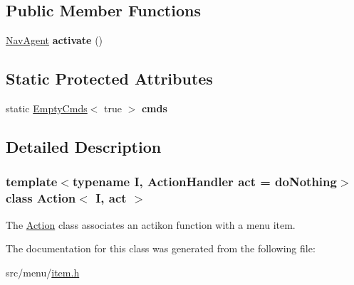 \subsection*{Public Member Functions}
\begin{DoxyCompactItemize}
\item 
\mbox{\label{classAction_a1a642e0df4201fa781e8143da61fd808}} 
\hyperlink{structNavAgent}{Nav\+Agent} {\bfseries activate} ()
\end{DoxyCompactItemize}
\subsection*{Static Protected Attributes}
\begin{DoxyCompactItemize}
\item 
\mbox{\label{classAction_ac978903bbe84c6781935745de76b63c0}} 
static \hyperlink{structEmptyCmds}{Empty\+Cmds}$<$ true $>$ {\bfseries cmds}
\end{DoxyCompactItemize}


\subsection{Detailed Description}
\subsubsection*{template$<$typename I, Action\+Handler act = do\+Nothing$>$\newline
class Action$<$ I, act $>$}

The \hyperlink{classAction}{Action} class associates an actikon function with a menu item. 

The documentation for this class was generated from the following file\+:\begin{DoxyCompactItemize}
\item 
src/menu/\hyperlink{item_8h}{item.\+h}\end{DoxyCompactItemize}
